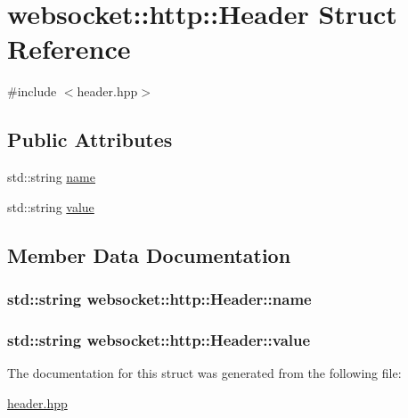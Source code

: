 \hypertarget{structwebsocket_1_1http_1_1Header}{}\section{websocket\+:\+:http\+:\+:Header Struct Reference}
\label{structwebsocket_1_1http_1_1Header}


{\ttfamily \#include $<$header.\+hpp$>$}

\subsection*{Public Attributes}
\begin{DoxyCompactItemize}
\item 
std\+::string \hyperlink{structwebsocket_1_1http_1_1Header_a4b940a160be2a3219f8654e2c3644278}{name}
\item 
std\+::string \hyperlink{structwebsocket_1_1http_1_1Header_a499a950573467aa038a07fa928dff30b}{value}
\end{DoxyCompactItemize}


\subsection{Member Data Documentation}
\subsubsection[{\texorpdfstring{name}{name}}]{\setlength{\rightskip}{0pt plus 5cm}std\+::string websocket\+::http\+::\+Header\+::name}\hypertarget{structwebsocket_1_1http_1_1Header_a4b940a160be2a3219f8654e2c3644278}{}\label{structwebsocket_1_1http_1_1Header_a4b940a160be2a3219f8654e2c3644278}
\subsubsection[{\texorpdfstring{value}{value}}]{\setlength{\rightskip}{0pt plus 5cm}std\+::string websocket\+::http\+::\+Header\+::value}\hypertarget{structwebsocket_1_1http_1_1Header_a499a950573467aa038a07fa928dff30b}{}\label{structwebsocket_1_1http_1_1Header_a499a950573467aa038a07fa928dff30b}


The documentation for this struct was generated from the following file\+:\begin{DoxyCompactItemize}
\item 
\hyperlink{header_8hpp}{header.\+hpp}\end{DoxyCompactItemize}
